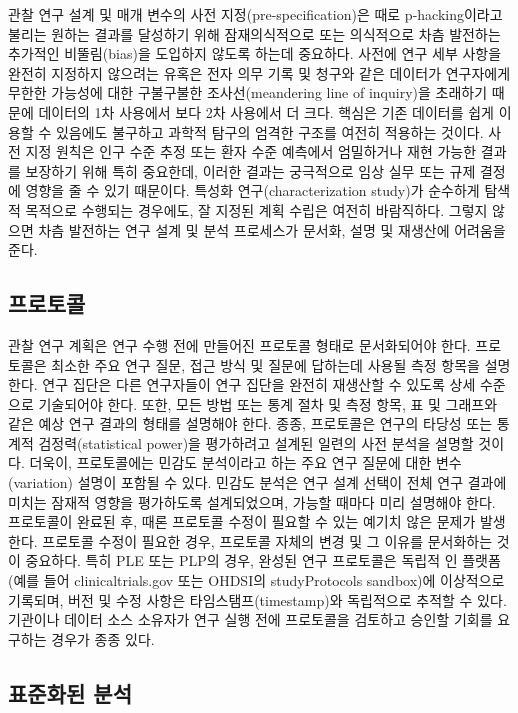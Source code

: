 \documentclass[11pt]{book}
\theoremstyle{definition}
\theoremstyle{definition}
\theoremstyle{definition}
\theoremstyle{remark}
\begin{document}
관찰 연구 설계 및 매개 변수의 사전 지정(pre-specification)은 때로
p-hacking이라고 불리는 원하는 결과를 달성하기 위해 잠재의식적으로 또는
의식적으로 차츰 발전하는 추가적인 비뚤림(bias)을 도입하지 않도록 하는데
중요하다. 사전에 연구 세부 사항을 완전히 지정하지 않으려는 유혹은 전자
의무 기록 및 청구와 같은 데이터가 연구자에게 무한한 가능성에 대한
구불구불한 조사선(meandering line of inquiry)을 초래하기 때문에 데이터의
1차 사용에서 보다 2차 사용에서 더 크다. 핵심은 기존 데이터를 쉽게 이용할
수 있음에도 불구하고 과학적 탐구의 엄격한 구조를 여전히 적용하는 것이다.
사전 지정 원칙은 인구 수준 추정 또는 환자 수준 예측에서 엄밀하거나 재현
가능한 결과를 보장하기 위해 특히 중요한데, 이러한 결과는 궁극적으로 임상
실무 또는 규제 결정에 영향을 줄 수 있기 때문이다. 특성화
연구(characterization study)가 순수하게 탐색적 목적으로 수행되는
경우에도, 잘 지정된 계획 수립은 여전히 바람직하다. 그렇지 않으면 차츰
발전하는 연구 설계 및 분석 프로세스가 문서화, 설명 및 재생산에 어려움을
준다.

\subsection{프로토콜}


관찰 연구 계획은 연구 수행 전에 만들어진 프로토콜 형태로 문서화되어야
한다. 프로토콜은 최소한 주요 연구 질문, 접근 방식 및 질문에 답하는데
사용될 측정 항목을 설명한다. 연구 집단은 다른 연구자들이 연구 집단을
완전히 재생산할 수 있도록 상세 수준으로 기술되어야 한다. 또한, 모든 방법
또는 통계 절차 및 측정 항목, 표 및 그래프와 같은 예상 연구 결과의 형태를
설명해야 한다. 종종, 프로토콜은 연구의 타당성 또는 통계적
검정력(statistical power)을 평가하려고 설계된 일련의 사전 분석을 설명할
것이다. 더욱이, 프로토콜에는 민감도 분석이라고 하는 주요 연구 질문에
대한 변수(variation) 설명이 포함될 수 있다. 민감도 분석은 연구 설계
선택이 전체 연구 결과에 미치는 잠재적 영향을 평가하도록 설계되었으며,
가능할 때마다 미리 설명해야 한다. 프로토콜이 완료된 후, 때론 프로토콜
수정이 필요할 수 있는 예기치 않은 문제가 발생한다. 프로토콜 수정이
필요한 경우, 프로토콜 자체의 변경 및 그 이유를 문서화하는 것이 중요하다.
특히 PLE 또는 PLP의 경우, 완성된 연구 프로토콜은 독립적 인 플랫폼(예를
들어 clinicaltrials.gov 또는 OHDSI의 studyProtocols sandbox)에
이상적으로 기록되며, 버전 및 수정 사항은 타임스탬프(timestamp)와
독립적으로 추적할 수 있다. 기관이나 데이터 소스 소유자가 연구 실행 전에
프로토콜을 검토하고 승인할 기회를 요구하는 경우가 종종 있다.

\subsection{표준화된 분석}\label{-}
\end{document}
